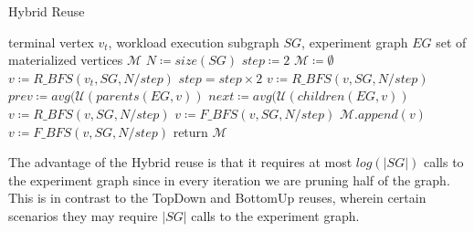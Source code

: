 {\begin{algorithm}[h]
\caption{Hybrid Reuse}\label{algorithm-hybrid}
\begin{algorithmic}[1]
\Require terminal vertex $v_t$, workload execution subgraph  $SG$, experiment graph $EG$ 
\Ensure set of materialized vertices $\mathcal{M}$ 
\State $N \coloneqq size(SG)$
\State $step \coloneqq 2$
\State $\mathcal{M} \coloneqq \emptyset$
\State $v \coloneqq R\_BFS(v_t, SG, N/step)$
		\State $step = step \times 2$
				\State $v \coloneqq R\_BFS(v, SG, N/step)$
				\State $prev \coloneqq avg (\mathcal{U}(parents(EG, v))$
				\State $next \coloneqq avg (\mathcal{U}(children(EG, v))$
						 \State $v \coloneqq R\_BFS(v, SG, N/step)$
				\Else
					\State $v \coloneqq F\_BFS(v, SG, N/step)$
				\EndIf
				\State $\mathcal{M}.append(v)$
				\State $v \coloneqq F\_BFS(v, SG, N/step)$
		\EndIf
\EndWhile
\State return $\mathcal{M}$
\end{algorithmic}
\end{algorithm}
The advantage of the Hybrid reuse is that it requires at most $log(|SG|)$ calls to the experiment graph since in every iteration we are pruning half of the graph.
This is in contrast to the TopDown and BottomUp reuses, wherein certain scenarios they may require $|SG|$ calls to the experiment graph.
}


